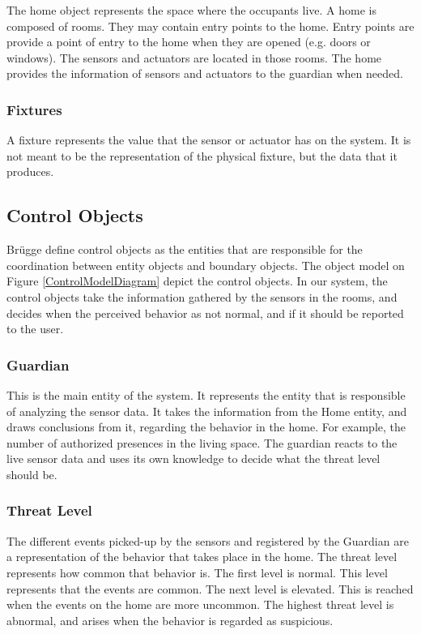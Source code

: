 
The home object represents the space where the occupants live. A home is composed of rooms. They may contain entry points to the home. Entry points are provide a point of entry to the home when they are opened (e.g. doors or windows). The sensors and actuators are located in those rooms. The home provides the information of sensors and actuators to the guardian when needed.

\subsubsection{Fixtures}
A fixture represents the value that the sensor or actuator has on the system. It is not meant to be the representation of the physical fixture, but the data that it produces.

\subsection{Control Objects}

Br{\"u}gge \etAl define control objects as the entities that are responsible for the coordination between entity objects and boundary objects. The object model on Figure \ref{ControlModelDiagram} depict the control objects. In our system, the control objects take the information gathered by the sensors in the rooms, and decides when the perceived behavior as not normal, and if it should be reported to the user.


\subsubsection{Guardian}
\label{sec:guardian}
This is the main entity of the system. It represents the entity that is responsible of analyzing the sensor data. It takes the information from the Home entity, and draws conclusions from it, regarding the behavior in the home. For example, the number of authorized presences in the living space. The guardian reacts to the live sensor data and uses its own knowledge to decide what the threat level should be.

\subsubsection{Threat Level}
The different events picked-up by the sensors and registered by the Guardian are a representation of the behavior that takes place in the home. The threat level represents how common that behavior is. The first level is normal. This level represents that the events are common. The next level is elevated. This is reached when the events on the home are more uncommon. The highest threat level is abnormal, and arises when the behavior is regarded as suspicious. 

